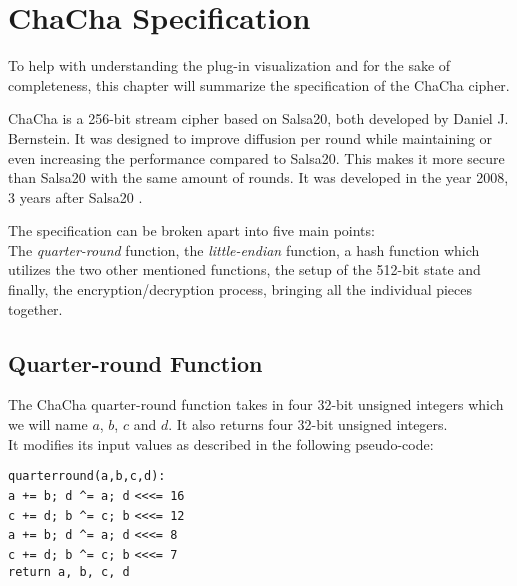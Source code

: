 
\chapter{ChaCha Specification}
\label{chap:chacha}

To help with understanding the plug-in visualization and for the sake of completeness, this chapter will summarize the specification of the ChaCha cipher.

ChaCha is a 256-bit stream cipher based on Salsa20, both developed by Daniel J. Bernstein. It was designed to improve diffusion per round while maintaining or even increasing the performance compared to Salsa20. This makes it more secure than Salsa20 with the same amount of rounds. It was developed in the year 2008, 3 years after Salsa20 \cite{chachaspec}.

The specification can be broken apart into five main points: \\
The \textit{quarter-round} function, the \textit{little-endian} function, a hash function which utilizes the two other mentioned functions, the setup of the 512-bit state and finally, the encryption/decryption process, bringing all the individual pieces together.

\section{Quarter-round Function}
\label{sec:chacha.qr}

The ChaCha quarter-round function takes in four 32-bit unsigned integers which we will name $a$, $b$, $c$ and $d$. It also returns four 32-bit unsigned integers.\\
It modifies its input values as described in the following pseudo-code:

\begin{center}
\begin{minipage}{0.5\linewidth}
\texttt{quarterround(a,b,c,d):} \\
\hspace*{2em}\texttt{a += b; d  \^{}= a; d} \verb|<<<|\texttt{= 16} \\
\hspace*{2em}\texttt{c += d; b \^{}= c; b} \verb|<<<|\texttt{= 12} \\
\hspace*{2em}\texttt{a += b; d \^{}= a; d} \verb|<<<|\texttt{= 8} \\
\hspace*{2em}\texttt{c += d; b \^{}= c; b} \verb|<<<|\texttt{= 7} \\
\hspace*{2em}\texttt{return a, b, c, d}
\end{minipage}
\end{center}

